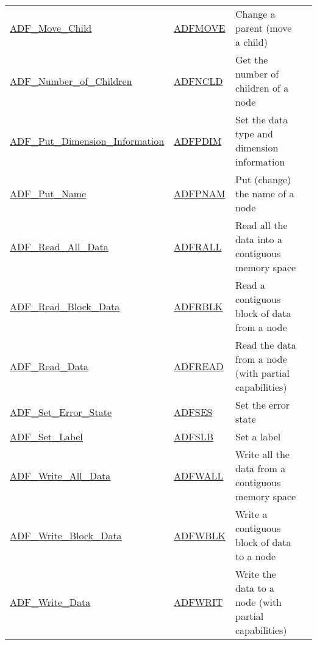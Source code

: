 \begin{longtable}{>{\ttfamily}l >{\ttfamily}l >{\raggedright\arraybackslash}p{\Pwidth} c}
\hyperlink{sub:Move\_Child}{ADF\_Move\_Child} &
   \hyperlink{sub:Move\_Child}{ADFMOVE} &
   Change a parent (move a child) &
   \pageref*{sub:Move_Child} \\
\hyperlink{sub:Number\_of\_Children}{ADF\_Number\_of\_Children} &
   \hyperlink{sub:Number\_of\_Children}{ADFNCLD} &
   Get the number of children of a node &
   \pageref*{sub:Number_of_Children} \\
\hyperlink{sub:Put\_Dimension\_Information}{ADF\_Put\_Dimension\_Information} &
   \hyperlink{sub:Put\_Dimension\_Information}{ADFPDIM} &
   Set the data type and dimension information &
   \pageref*{sub:Put_Dimension_Information} \\
\hyperlink{sub:Put\_Name}{ADF\_Put\_Name} &
   \hyperlink{sub:Put\_Name}{ADFPNAM} &
   Put (change) the name of a node &
   \pageref*{sub:Put_Name} \\
\hyperlink{sub:Read\_All\_Data}{ADF\_Read\_All\_Data} &
   \hyperlink{sub:Read\_All\_Data}{ADFRALL} &
   Read all the data into a contiguous memory space &
   \pageref*{sub:Read_All_Data} \\
\hyperlink{sub:Read\_Block\_Data}{ADF\_Read\_Block\_Data} &
   \hyperlink{sub:Read\_Block\_Data}{ADFRBLK} &
   Read a contiguous block of data from a node &
   \pageref*{sub:Read_Block_Data} \\
\hyperlink{sub:Read\_Data}{ADF\_Read\_Data} &
   \hyperlink{sub:Read\_Data}{ADFREAD} &
   Read the data from a node (with partial capabilities) &
   \pageref*{sub:Read_Data} \\
\hyperlink{sub:Set\_Error\_State}{ADF\_Set\_Error\_State} &
   \hyperlink{sub:Set\_Error\_State}{ADFSES} &
   Set the error state &
   \pageref*{sub:Set_Error_State} \\
\hyperlink{sub:Set\_Label}{ADF\_Set\_Label} &
   \hyperlink{sub:Set\_Label}{ADFSLB} &
   Set a label &
   \pageref*{sub:Set_Label} \\
\hyperlink{sub:Write\_All\_Data}{ADF\_Write\_All\_Data} &
   \hyperlink{sub:Write\_All\_Data}{ADFWALL} &
   Write all the data from a contiguous memory space &
   \pageref*{sub:Write_All_Data} \\
\hyperlink{sub:Write\_Block\_Data}{ADF\_Write\_Block\_Data} &
   \hyperlink{sub:Write\_Block\_Data}{ADFWBLK} &
   Write a contiguous block of data to a node &
   \pageref*{sub:Write_Block_Data} \\
\hyperlink{sub:Write\_Data}{ADF\_Write\_Data} &
   \hyperlink{sub:Write\_Data}{ADFWRIT} &
   Write the data to a node (with partial capabilities) &
   \pageref*{sub:Write_Data}
\end{longtable}

\newpage

\newpage

\newpage

\newpage

\newpage


